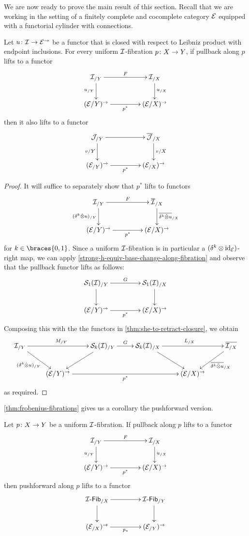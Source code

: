 \documentclass[reqno,10pt,a4paper,oneside,draft]{amsart}
\begin{document}
We are now ready to prove the main result of this section.
Recall that we are working in the setting of a finitely complete and cocomplete category $\cal{E}$ equipped with a functorial cylinder with connections.

\begin{theorem} \label{thm:frobenius-fibrations}
Let $u \co \cal{I} \to \catE^\to$ be a functor that is closed with respect to Leibniz product with endpoint inclusions.
For every uniform $\cal{I}$-fibration $p \co X \to Y$, if pullback along $p$ lifts to a functor
\[
\xymatrix@C+2em{
  \cal{I}_{/Y}
  \ar[r]^{F}
  \ar[d]_{u_{/Y}}
&
  \cal{I}_{/X}
  \ar[d]^{u_{/X}}
\\
  (\catE / Y)^\to
  \ar[r]_{p^*}
&
  (\catE / X)^\to
}
\]
then it also lifts to a functor
\[
\xymatrix@C+2em{
  \cal{J}_{/Y} \ar[r] \ar[d]_{v/Y} & \overline{\cal{J}}_{/X} \ar[d]^{v/X} \\
  (\cal{E}_{/Y})^\to \ar[r]_{p^*} & (\cal{E}_{/X})^\to
}
\]
\end{theorem}

\begin{proof}
It will suffice to separately show that $p^*$ lifts to functors
\[
\xymatrix@C+2em{
  \cal{I}_{/Y}
  \ar[r]^{F}
  \ar[d]_{(\kcyl \hatotimes u)_{/Y}}
&
  \overline{\cal{I}}_{/X}
  \ar[d]^{ \overline{\kcyl \hatotimes u}_{/X}}
\\
  (\catE / Y)^\to
  \ar[r]_{p^*}
&
  (\catE / X)^\to
}
\]
for $k \in \braces{0, 1}$.
Since a uniform $\cal{I}$-fibration is in particular a $(\kcyl \otimes \id_\catE)$-right map, we can apply \cref{strong-h-equiv-base-change-along-fibration} and observe that the pullback functor lifts as follows:
\[
\xymatrix@C+2em{
  \cal{S}_1(\cal{I})_{/Y}
  \ar[r]^{G}
  \ar[d]
&
  \cal{S}_1(\cal{I})_{/X}
  \ar[d] \\
  (\catE / Y)^\to
  \ar[r]_{p^*}
&
  (\catE / X)^\to
}
\]
Composing this with the the functors in \cref{thm:she-to-retract-closure}, we obtain
\[
\xymatrix{
  \cal{I}_{/Y}
  \ar[rr]^{M_{/Y}}
  \ar[dr]_{(\kcyl \hatotimes u)_{/Y}} &
&
  \cal{S}_k(\cal{I})_{/Y}
  \ar[r]^G
  \ar[dl]
&
  \cal{S}_k(\cal{I})_{/X}
  \ar[rr]^{L_{/X}}
  \ar[dr]
& &
  \overline{\cal{I}_{/X}}
  \ar[dl]^{\overline{\kcyl \hatotimes u}_{/X}}
\\ &
  (\catE/Y)^\to
  \ar[rrr]_{p^*}
&&&
  (\catE/X)^\to
}
\]
as required.
\end{proof}

\cref{thm:frobenius-fibrations} gives us a corollary the pushforward version.

\begin{corollary}
Let $p \co X \to Y$ be a uniform $\cal{I}$-fibration.
If pullback along $p$ lifts to a functor
\[
\xymatrix@C+2em{
  \cal{I}_{/Y}
  \ar[r]^{F}
  \ar[d]_{u_{/Y}}
&
  \cal{I}_{/X}
  \ar[d]^{u_{/X}}
\\
  (\catE / Y)^\to
  \ar[r]_{p^*}
&
  (\catE / X)^\to
}
\]
then pushforward along $p$ lifts to a functor
\[
\xymatrix@C+2em{
  \Fib{\cal{I}}_{/X} \ar[r] \ar[d]_{} & \Fib{\cal{I}}_{/Y} \ar[d] \\
  (\cal{E}_{/X})^\to \ar[r]_{p_*} & (\cal{E}_{/Y})^\to
}
\]
\end{corollary}
\end{document}
